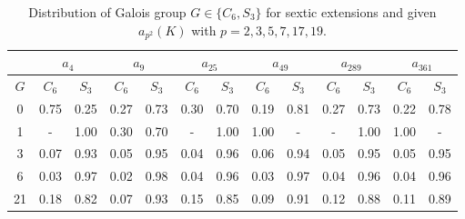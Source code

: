 \documentclass[letterpaper, 10pt]{article}
\newcommand{\1}{\mathds{1}}	%
\theoremstyle{definition}
\theoremstyle{remark}
\begin{document}
\begin{table}[H]
   \begin{center}
        \begin{tabular}{c|c|c|c|c|c|c|c|c|c|c|c|c}
            \toprule
            & \multicolumn{2}{c|}{$a_{4}$} & \multicolumn{2}{c|}{$a_{9}$} & \multicolumn{2}{c|}{$a_{25}$} & \multicolumn{2}{c|}{$a_{49}$} & \multicolumn{2}{c|}{$a_{289}$} & \multicolumn{2}{c}{$a_{361}$} \\
            \midrule
            $G$ & $C_{6}$ & $S_{3}$ & $C_{6}$ & $S_{3}$ & $C_{6}$ & $S_{3}$ & $C_{6}$ & $S_{3}$ & $C_{6}$ & $S_{3}$ & $C_{6}$ & $S_{3}$ \\
            \midrule
            0 & 0.75 & 0.25 & 0.27 & 0.73 & 0.30 & 0.70 & 0.19 & 0.81 & 0.27 & 0.73 & 0.22 & 0.78 \\
            1 & - & 1.00 & 0.30 & 0.70 & - & 1.00 & 1.00 & - & - & 1.00 & 1.00 & - \\
            3 & 0.07 & 0.93 & 0.05 & 0.95 & 0.04 & 0.96 & 0.06 & 0.94 & 0.05 & 0.95 & 0.05 & 0.95 \\
            6 & 0.03 & 0.97 & 0.02 & 0.98 & 0.04 & 0.96 & 0.03 & 0.97 & 0.04 & 0.96 & 0.04 & 0.96 \\
            21 & 0.18 & 0.82 & 0.07 & 0.93 & 0.15 & 0.85 & 0.09 & 0.91 & 0.12 & 0.88 & 0.11 & 0.89 \\
            \bottomrule
        \end{tabular}
        \caption{Distribution of Galois group $G \in \{C_6, S_3\}$ for sextic extensions and given $a_{p^2}(K)$ with $p = 2, 3, 5, 7, 17, 19$.}
        \label{tab:sextic_psq_dist_G}
   \end{center}
\end{table}
\end{document}
